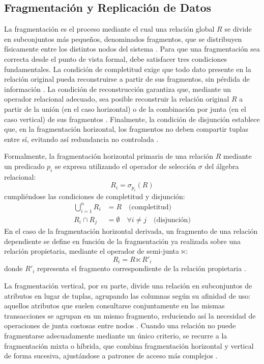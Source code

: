 \documentclass[12pt, a4paper]{article}
\begin{document}
\subsection{Fragmentación y Replicación de Datos}

La fragmentación es el proceso mediante el cual una relación global $R$ se divide en subconjuntos más pequeños, denominados fragmentos, que se distribuyen físicamente entre los distintos nodos del sistema \cite{ozsu2020principles}. Para que una fragmentación sea correcta desde el punto de vista formal, debe satisfacer tres condiciones fundamentales. La condición de completitud exige que todo dato presente en la relación original pueda reconstruirse a partir de sus fragmentos, sin pérdida de información \cite{ozsu2020principles}. La condición de reconstrucción garantiza que, mediante un operador relacional adecuado, sea posible reconstruir la relación original $R$ a partir de la unión (en el caso horizontal) o de la combinación por junta (en el caso vertical) de sus fragmentos \cite{ozsu2020principles}. Finalmente, la condición de disjunción establece que, en la fragmentación horizontal, los fragmentos no deben compartir tuplas entre sí, evitando así redundancia no controlada \cite{ozsu2020principles}.

Formalmente, la fragmentación horizontal primaria de una relación $R$ mediante un predicado $p_i$ se expresa utilizando el operador de selección $\sigma$ del álgebra relacional:
\begin{equation}
R_i = \sigma_{p_i}(R)
\end{equation}
cumpliéndose las condiciones de completitud y disjunción:
\begin{align}
\bigcup_{i=1}^{n} R_i &= R \quad \text{(completitud)} \\
R_i \cap R_j &= \emptyset \quad \forall i \neq j \quad \text{(disjunción)}
\end{align}
En el caso de la fragmentación horizontal derivada, un fragmento de una relación dependiente se define en función de la fragmentación ya realizada sobre una relación propietaria, mediante el operador de semi-junta $\ltimes$:
\begin{equation}
R_i = R \ltimes R'_i
\end{equation}
donde $R'_i$ representa el fragmento correspondiente de la relación propietaria \cite{ozsu2020principles}.

La fragmentación vertical, por su parte, divide una relación en subconjuntos de atributos en lugar de tuplas, agrupando las columnas según su afinidad de uso: aquellos atributos que suelen consultarse conjuntamente en las mismas transacciones se agrupan en un mismo fragmento, reduciendo así la necesidad de operaciones de junta costosas entre nodos \cite{ozsu2020principles}. Cuando una relación no puede fragmentarse adecuadamente mediante un único criterio, se recurre a la fragmentación mixta o híbrida, que combina fragmentación horizontal y vertical de forma sucesiva, ajustándose a patrones de acceso más complejos \cite{ozsu2020principles}.
\end{document}
